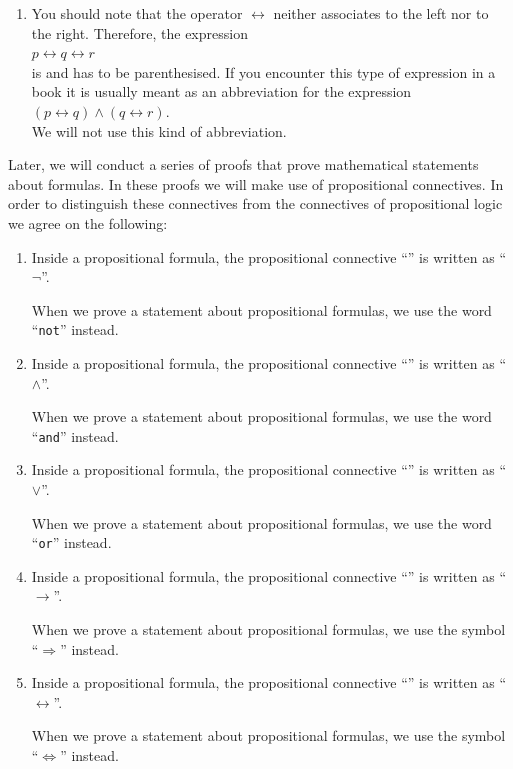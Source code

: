 \begin{enumerate}
      \hspace*{1.3cm} $p \rightarrow q \leftrightarrow r$ \quad instead of \quad $(p \rightarrow q) \leftrightarrow
      r$.
\item You should note that the operator $\leftrightarrow$ neither associates to the left nor to the right.
      Therefore, the expression
      \\[0.2cm]
      \hspace*{1.3cm}
      $p \leftrightarrow q \leftrightarrow r$
      \\[0.2cm]
      is \underline{\textbf{}} and has to be parenthesised.  If you encounter this type of expression
      in a book it is usually meant as an abbreviation for the expression
      \\[0.2cm]
      \hspace*{1.3cm}
      $(p \leftrightarrow q) \wedge (q \leftrightarrow r)$.
      \\[0.2cm]
      We will not use this kind of abbreviation.
\end{enumerate}

\remarkEng
Later, we will conduct a series of proofs that prove mathematical statements about formulas.
In these proofs we will make use of propositional connectives.  In order to distinguish these connectives from
the connectives of propositional logic we agree on the following:
\begin{enumerate}
\item Inside a propositional formula, the propositional connective
      ``'' is written as ``$\neg$''.
  
      When we prove a statement about propositional formulas, we use the word ``\texttt{not}'' instead.
\item Inside a propositional formula, the propositional connective
      ``'' is written as ``$\wedge$''.
  
      When we prove a statement about propositional formulas, we use the word ``\texttt{and}'' instead.
\item Inside a propositional formula, the propositional connective
      ``'' is written as ``$\vee$''.
  
      When we prove a statement about propositional formulas, we use the word ``\texttt{or}'' instead.
\item Inside a propositional formula, the propositional connective
      ``'' is written as ``$\rightarrow$''.
  
      When we prove a statement about propositional formulas, we use the symbol ``$\Rightarrow$'' instead.
\item Inside a propositional formula, the propositional connective
      ``'' is written as ``$\leftrightarrow$''.
  
      When we prove a statement about propositional formulas, we use the symbol ``$\Leftrightarrow$'' instead.
      \eox
\end{enumerate}

